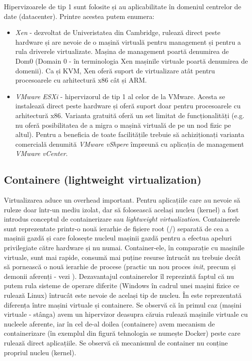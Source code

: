 Hipervizoarele de tip 1 sunt folosite și au aplicabilitate în domeniul centrelor
de date (datacenter). Printre acestea putem enumera:

\begin{itemize}
	\item \textit{Xen} - dezvoltat de Univeristatea din Cambridge, rulează
		direct peste hardware și are nevoie de o mașină virtuală pentru
		management și pentru a rula driverele virtualizate. Mașina de
		management poartă denumirea de Dom0 (Domain 0 - în terminologia
		Xen mașinile virtuale poartă denumirea de domenii). Ca și KVM,
		Xen oferă suport de virtualizare atât pentru procesoarele cu
		arhitectură x86 cât și ARM.
	\item \textit{VMware ESXi} - hipervizorul de tip 1 al celor de la
		VMware. Acesta se instalează direct peste hardware și oferă
		suport doar pentru procesoarele cu arhitectură x86. Varianta
		gratuită oferă un set limitat de funcționalități (e.g. nu oferă
		posibilitatea de a migra o mașină virtuală de pe un nod fizic pe
		altul). Pentru a beneficia de toate facilitățile trebuie să
		achiziționați varianta comercială denumită \textit{VMware
		vShpere} împreună cu aplicația de management \textit{VMware
		vCenter}.
\end{itemize}

\subsection{Containere (lightweight virtualization)}
\label{sec:vm-intro-containers}

Virtualizarea aduce un overhead important. Pentru aplicațiile care au nevoie să
ruleze doar într-un mediu izolat, dar să folosească același nucleu (kernel) a
fost introdus conceptul de containerizare sau \textit{lightweight
virtualization}. Containerele sunt reprezentate printr-o nouă ierarhie de
fișiere root (/) separată de cea a mașinii gazdă și care folosește nucleul
mașinii gazdă pentru a efectua apeluri privilegiate către hardware și nu numai.
Container-ele, în comparație cu mașinile virtuale, sunt mai rapide, consumă mai
puține resurse întrucât nu trebuie decât să pornească o nouă ierarhie de procese
(practic un nou proces \textit{init}, precum și demonii aferenți - vezi
). Dezavantajul containerelor îl
reprezintă faptul că nu putem rula sisteme de operare diferite (Windows în
cadrul unei mașini fizice ce rulează Linux) întrucât este nevoie de același tip
de nucleu. În  este reprezentată
diferența între mașini virtuale și containere. Se observă că în primul caz
(mașini virtuale - stânga) avem un hipervizor deasupra căruia rulează mașinile
virtuale cu nucleele aferente, iar în cel de-al doilea (containere) avem
mecanism de containerizare (în exemplul din figură tehnologia se numește Docker)
peste care rulează direct aplicațiile. Se observă că mecanismul de container nu
conține propriul nucleu (kernel).

